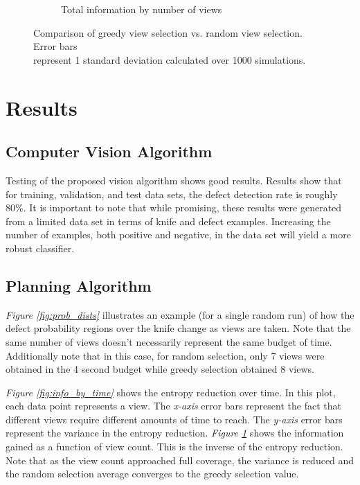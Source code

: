 \documentclass[letterpaper, 10 pt, conference]{ieeeconf}  %
\begin{document}
\begin{figure}
\begin{subfigure}[b]{.49\textwidth}
        \caption{Total information by number of views}
        \vspace*{2mm}
        \label{fig:info_by_view}
    \end{subfigure}
    \caption{Comparison of greedy view selection vs. random view selection. Error bars \\ represent 1 standard deviation calculated over 1000 simulations.}
    \label{fig:info gains}
\end{figure}

\section{Results}

\subsection{Computer Vision Algorithm}

Testing of the proposed vision algorithm shows good results. Results show that for training, validation, and test data sets, the defect detection rate is roughly 80\%. It is important to note that while promising, these results were generated from a limited data set in terms of knife and defect examples. Increasing the number of examples, both positive and negative, in the data set will yield a more robust classifier.

\subsection{Planning Algorithm}

\textit{Figure \ref{fig:prob_dists}} illustrates an example (for a single random run) of how the defect probability regions over the knife change as views are taken. Note that the same number of views doesn't necessarily represent the same budget of time. Additionally note that in this case, for random selection, only 7 views were obtained in the 4 second budget while greedy selection obtained 8 views.

\textit{Figure \ref{fig:info_by_time}} shows the entropy reduction over time. In this plot, each data point represents a view. The \textit{x-axis} error bars represent the fact that different views require different amounts of time to reach. The \textit{y-axis} error bars represent the variance in the entropy reduction. \textit{Figure \ref{fig:info_by_view}} shows the information gained as a function of view count. This is the inverse of the entropy reduction. Note that as the view count approached full coverage, the variance is reduced and the random selection average converges to the greedy selection value.
\end{document}
